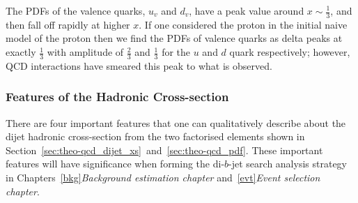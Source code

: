 The PDFs of the valence quarks, $u_v$ and $d_v$, have a peak value around $x \sim \frac{1}{3}$, and then fall off rapidly at higher $x$.
If one considered the proton in the initial naive model of the proton then we find the PDFs of valence quarks as delta peaks at exactly $\frac{1}{3}$
with amplitude of $\frac{2}{3}$ and $\frac{1}{3}$ for the $u$ and $d$ quark respectively;
however, QCD interactions have smeared this peak to what is observed.

\subsubsection{Features of the Hadronic Cross-section}

There are four important features that one can qualitatively describe about the dijet hadronic cross-section
from the two factorised elements shown in Section~\ref{sec:theo-qcd_dijet_xs}~and~\ref{sec:theo-qcd_pdf}.
These important features will have significance when forming the di-$b$-jet search analysis strategy in
Chapters~\ref{bkg}\textit{Background estimation chapter} and~\ref{evt}\textit{Event selection chapter}.

